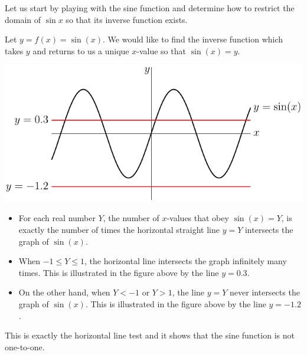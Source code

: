 Let us start by playing with the sine function and determine how to restrict
the domain of $\sin x$ so that its inverse function exists.
\begin{eg}\label{eg:INVstilllesslucky}
Let $y=f(x)=\sin(x)$. We would like to find the inverse function which takes
$y$ and returns to us a unique $x$-value so that $\sin(x)=y$.
\begin{efig}
\begin{center}
  \includegraphics{sinInv}
\end{center}
\end{efig}
\begin{itemize}
 \item For each real number $Y$, the number of $x$-values that obey
$\sin(x)=Y$, is exactly the number of times the horizontal straight line
$y=Y$ intersects the graph of $\sin(x)$.
\item When $-1\le Y\le 1$, the horizontal line intersects the graph infinitely many
times. This is illustrated in the figure above by the line $y=0.3$.
\item On the other hand, when $Y<-1$ or $Y>1$, the line $y=Y$ never
intersects the graph of $\sin(x)$. This is illustrated in the figure above by
the line $y=-1.2$.
\end{itemize}
This is exactly the horizontal line test and it shows that the sine function is
not one-to-one.


\end{eg}
